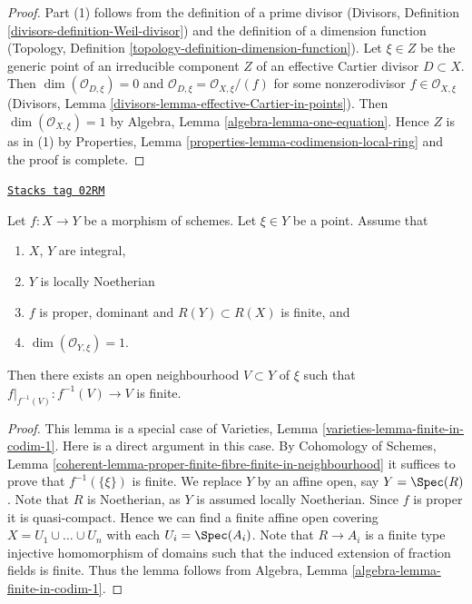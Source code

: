 \begin{proof}
Part (1) follows from the definition of a prime divisor
(Divisors, Definition \ref{divisors-definition-Weil-divisor})
and the definition of a dimension function
(Topology, Definition \ref{topology-definition-dimension-function}).
Let $\xi \in Z$ be the generic point of an irreducible component $Z$ of
an effective Cartier divisor $D \subset X$.
Then $\dim(\mathcal{O}_{D, \xi}) = 0$ and
$\mathcal{O}_{D, \xi} = \mathcal{O}_{X, \xi}/(f)$ for some
nonzerodivisor $f \in \mathcal{O}_{X, \xi}$ (Divisors,
Lemma \ref{divisors-lemma-effective-Cartier-in-points}).
Then $\dim(\mathcal{O}_{X, \xi}) = 1$ by
Algebra, Lemma \ref{algebra-lemma-one-equation}. Hence $Z$ is as in (1) by
Properties, Lemma \ref{properties-lemma-codimension-local-ring}
and the proof is complete.
\end{proof}

\begin{lemma}
\label{chow-lemma-finite-in-codimension-one}
\href{https://stacks.math.columbia.edu/tag/02RM}{\texttt{Stacks tag 02RM}}

Let $f : X \to Y$ be a morphism of schemes.
Let $\xi \in Y$ be a point.
Assume that
\begin{enumerate}
\item $X$, $Y$ are integral,
\item $Y$ is locally Noetherian
\item $f$ is proper, dominant and $R(Y) \subset R(X)$ is finite, and
\item $\dim(\mathcal{O}_{Y, \xi}) = 1$.
\end{enumerate}
Then there exists an open neighbourhood $V \subset Y$ of $\xi$
such that $f|_{f^{-1}(V)} : f^{-1}(V) \to V$ is finite.
\end{lemma}

\begin{proof}
This lemma is a special case of
Varieties, Lemma \ref{varieties-lemma-finite-in-codim-1}.
Here is a direct argument in this case.
By Cohomology of Schemes,
Lemma \ref{coherent-lemma-proper-finite-fibre-finite-in-neighbourhood}
it suffices to prove that $f^{-1}(\{\xi\})$ is finite.
We replace $Y$ by an affine open, say $Y = \Spec(R)$.
Note that $R$ is Noetherian, as $Y$ is assumed locally Noetherian.
Since $f$ is proper it is quasi-compact. Hence we can find a finite
affine open covering $X = U_1 \cup \ldots \cup U_n$ with
each $U_i = \Spec(A_i)$. Note that $R \to A_i$ is a
finite type injective homomorphism of domains such that
the induced extension of fraction fields is finite.
Thus the lemma follows
from Algebra, Lemma \ref{algebra-lemma-finite-in-codim-1}.
\end{proof}

